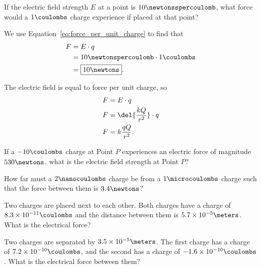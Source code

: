 \documentclass[12pt,paper=letter]{scrartcl}
\begin{document}
    \begin{exboxed}
        If the electric field strength $E$ at a point is $10 \newtonsspercoulomb$,
        what force would a $1 \coulombs$ charge experience if placed at that point?
    \end{exboxed}

    We use Equation~\ref{eq:force_per_unit_charge} to find that
    \begin{align*}
        F &= E\cdot q\\
        &= 10 \newtonspercoulomb \cdot 1 \coulombs\\
        &= \boxed{10 \newtons}.
    \end{align*}

    \pagebreak[2]
    \begin{thmboxed}
        The electric field is equal to force per unit charge,
        so
        \begin{align*}
            F &= E\cdot q\\
            F &= \del{\frac{kQ}{r^2}}\cdot q\\
            F &= k\frac{qQ}{r^2}.
        \end{align*}
    \end{thmboxed}

    \begin{mdframed}[style=exmdbox]
        \begin{problem}
            If a $-10 \coulombs$ charge at Point $P$ experiences an electric force of magnitude $530\newtons$,
            what is the electric field strength at Point $P$?
        \end{problem}

        \begin{problem}
            How far must a $2\nanocoulombs$ charge be from a $1\microcoulombs$ charge such that the force between them\footnotemark{} is $3.4\newtons$?
            \hint{\ref{hint:table_of_conversions}}
        \end{problem}

        \begin{problem}[Shieh]
            Two charges are placed next to each other.
            Both charges have a charge of $8.3\times10^{-11}\coulombs$ and the distance between them is $5.7\times10^{-5}\meters$.
            What is the electrical force?
        \end{problem}

        \begin{problem}[Shieh]
            Two charges are separated by $3.5\times10^{-5}\meters$.
            The first charge has a charge of $7.2\times10^{-10}\coulombs$,
            and the second has a charge of $-1.6\times10^{-10}\coulombs$.
            What is the electrical force between them?
        \end{problem}
    \end{mdframed}
\end{document}
